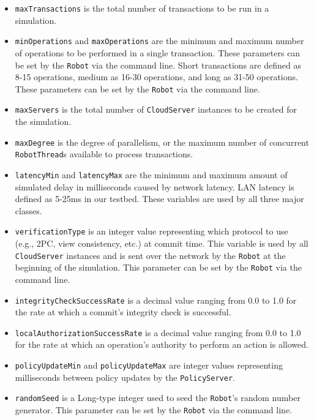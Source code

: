 \documentclass[11pt]{article}
\begin{document}
\begin{itemize}
\item{}\texttt{maxTransactions} is the total number of transactions to be run in a simulation.
\item{}\texttt{minOperations} and \texttt{maxOperations} are the minimum and maximum number of operations to be performed in a single transaction. These parameters can be set by the \texttt{Robot} via the command line. Short transactions are defined as 8-15 operations, medium as 16-30 operations, and long as 31-50 operations. These parameters can be set by the \texttt{Robot} via the command line.
\item{}\texttt{maxServers} is the total number of \texttt{CloudServer} instances to be created for the simulation.
\item{}\texttt{maxDegree} is the degree of parallelism, or the maximum number of concurrent \texttt{RobotThread}s available to process transactions.
\item{}\texttt{latencyMin} and \texttt{latencyMax} are the minimum and maximum amount of simulated delay in milliseconds caused by network latency. LAN latency is defined as 5-25ms in our testbed. These variables are used by all three major classes.
\item{}\texttt{verificationType} is an integer value representing which protocol to use (e.g., 2PC, view consistency, etc.) at commit time. This variable is used by all \texttt{CloudServer} instances and is sent over the network by the \texttt{Robot} at the beginning of the simulation. This parameter can be set by the \texttt{Robot} via the command line.
\item{}\texttt{integrityCheckSuccessRate} is a decimal value ranging from 0.0 to 1.0 for the rate at which a commit's integrity check is successful.
\item{}\texttt{localAuthorizationSuccessRate} is a decimal value ranging from 0.0 to 1.0 for the rate at which an operation's authority to perform an action is allowed.
\item{}\texttt{policyUpdateMin} and \texttt{policyUpdateMax} are integer values representing milliseconds between policy updates by the \texttt{PolicyServer}.
\item{}\texttt{randomSeed} is a Long-type integer used to seed the \texttt{Robot}'s random number generator. This parameter can be set by the \texttt{Robot} via the command line.
\end{itemize}
\end{document}

